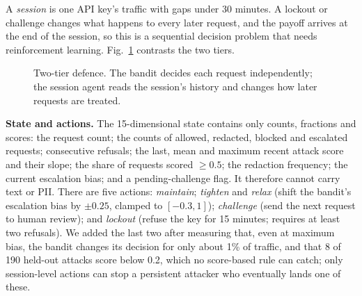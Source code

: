 \documentclass[conference]{IEEEtran}
\begin{document}
A \emph{session} is one API key's traffic with gaps under 30 minutes. A
lockout or challenge changes what happens to every later request, and the
payoff arrives at the end of the session, so this is a sequential decision
problem that needs reinforcement learning. Fig.~\ref{fig:tiers} contrasts
the two tiers.

\begin{figure}[t]
\centering
{}
\caption{Two-tier defence. The bandit decides each request independently;
the session agent reads the session's history and changes how later
requests are treated.}
\label{fig:tiers}
\end{figure}

\textbf{State and actions.} The 15-dimensional state contains only counts,
fractions and scores: the request count; the counts of allowed, redacted,
blocked and escalated requests; consecutive refusals; the last, mean and
maximum recent attack score and their slope; the share of requests scored
$\ge 0.5$; the redaction frequency; the current escalation bias; and a
pending-challenge flag. It therefore cannot carry text or PII. There are
five actions: \emph{maintain}; \emph{tighten} and \emph{relax} (shift the
bandit's escalation bias by $\pm0.25$, clamped to $[-0.3,1]$);
\emph{challenge} (send the next request to human review); and
\emph{lockout} (refuse the key for 15 minutes; requires at least two
refusals). We added the last two after measuring that, even at maximum
bias, the bandit changes its decision for only about 1\% of traffic, and
that 8 of 190 held-out attacks score below 0.2, which no score-based rule
can catch; only session-level actions can stop a persistent attacker who
eventually lands one of these.
\end{document}
